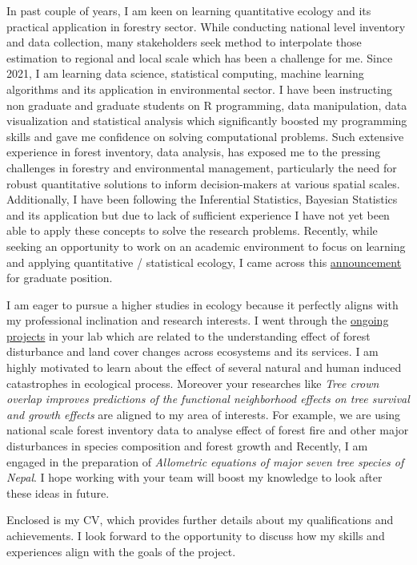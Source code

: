 \documentclass[
]{article}
\begin{document}
In past couple of years, I am keen on learning quantitative ecology and
its practical application in forestry sector. While conducting national
level inventory and data collection, many stakeholders seek method to
interpolate those estimation to regional and local scale which has been
a challenge for me. Since 2021, I am learning data science, statistical
computing, machine learning algorithms and its application in
environmental sector. I have been instructing non graduate and graduate
students on R programming, data manipulation, data visualization and
statistical analysis which significantly boosted my programming skills
and gave me confidence on solving computational problems. Such extensive
experience in forest inventory, data analysis, has exposed me to the
pressing challenges in forestry and environmental management,
particularly the need for robust quantitative solutions to inform
decision-makers at various spatial scales. Additionally, I have been
following the Inferential Statistics, Bayesian Statistics and its
application but due to lack of sufficient experience I have not yet been
able to apply these concepts to solve the research problems. Recently,
while seeking an opportunity to work on an academic environment to focus
on learning and applying quantitative / statistical ecology, I came
across this \href{https://uriartelab.org/opportunities/}{announcement}
for graduate position.

I am eager to pursue a higher studies in ecology because it perfectly
aligns with my professional inclination and research interests. I went
through the
\href{https://www.columbia.edu/~mu2126/researchprojects.html}{ongoing
projects} in your lab which are related to the understanding effect of
forest disturbance and land cover changes across ecosystems and its
services. I am highly motivated to learn about the effect of several
natural and human induced catastrophes in ecological process. Moreover
your researches like \emph{Tree crown overlap improves predictions of
the functional neighborhood effects on tree survival and growth effects}
are aligned to my area of interests. For example, we are using national
scale forest inventory data to analyse effect of forest fire and other
major disturbances in species composition and forest growth and
Recently, I am engaged in the preparation of \emph{Allometric equations
of major seven tree species of Nepal}. I hope working with your team
will boost my knowledge to look after these ideas in future.

Enclosed is my CV, which provides further details about my
qualifications and achievements. I look forward to the opportunity to
discuss how my skills and experiences align with the goals of the
project.
\end{document}
